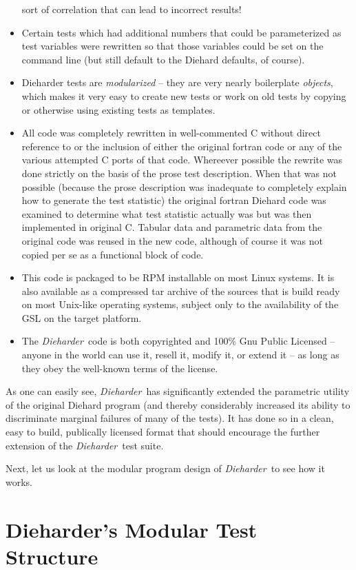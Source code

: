 \documentclass[12pt]{book}
\newcommand{\die}{\emph{Dieharder}\ }
\begin{document}
\begin{itemize}
sort of correlation that can lead to incorrect results!
 \item Certain tests which had additional numbers that could be
parameterized as test variables were rewritten so that those variables
could be set on the command line (but still default to the Diehard
defaults, of course).
 \item Dieharder tests are {\em modularized} -- they are very nearly
boilerplate {\em objects}, which makes it very easy to create new tests
or work on old tests by copying or otherwise using existing tests as
templates.
 \item All code was completely rewritten in well-commented C without
direct reference to or the inclusion of either the original fortran code
or any of the various attempted C ports of that code.  Whereever
possible the rewrite was done strictly on the basis of the prose test
description.  When that was not possible (because the prose description
was inadequate to completely explain how to generate the test statistic)
the original fortran Diehard code was examined to determine what test
statistic actually was but was then implemented in original C.  Tabular
data and parametric data from the original code was reused in the new
code, although of course it was not copied per se as a functional block
of code.
 \item This code is packaged to be RPM installable on most Linux
systems.  It is also available as a compressed tar archive of the
sources that is build ready on most Unix-like operating systems, subject
only to the availability of the GSL on the target platform.
 \item The \die code is both copyrighted and 100\% Gnu Public
Licensed -- anyone in the world can use it, resell it, modify it, or
extend it -- as long as they obey the well-known terms of the license.
\end{itemize}

As one can easily see, \die has significantly extended the parametric
utility of the original Diehard program (and thereby considerably
increased its ability to discriminate marginal failures of many of the
tests).  It has done so in a clean, easy to build, publically licensed
format that should encourage the further extension of the \die test
suite.

Next, let us look at the modular program design of \die to see how
it works.

\chapter{Dieharder's Modular Test Structure}
\end{document}

